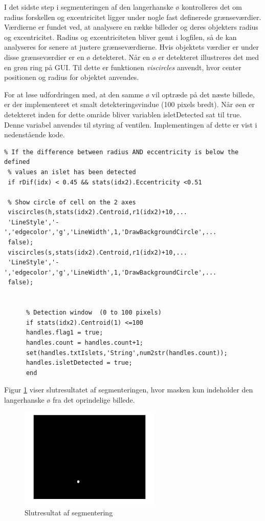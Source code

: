 I det sidste step i segmenteringen af den langerhanske ø kontrolleres det om radius forskellen og excentricitet ligger under nogle fast definerede grænseværdier. Værdierne er fundet ved, at analysere en række billeder og deres objekters radius og excentricitet. Radius og excentriciteten bliver gemt i logfilen, så de kan analyseres for senere at justere grænseværdierne. Hvis objektets værdier er under disse grænseværdier er en ø detekteret. Når en ø er detekteret illustreres det med en grøn ring på GUI. Til dette er funktionen \textit{viscircles} anvendt, hvor center positionen og radius for objektet anvendes. 

For at løse udfordringen med, at den samme ø vil optræde på det næste billede, er der implementeret et smalt detekteringsvindue (100 pixels bredt). Når øen er detekteret inden for dette område bliver variablen isletDetected sat til true. Denne variabel anvendes til styring af ventilen. Implementingen af dette er vist i nedenstående kode.


\begin{lstlisting} 
% If the difference between radius AND eccentricity is below the defined
 % values an islet has been detected
 if rDif(idx) < 0.45 && stats(idx2).Eccentricity <0.51
     
 % Show circle of cell on the 2 axes
 viscircles(h,stats(idx2).Centroid,r1(idx2)+10,...
 'LineStyle','-','edgecolor','g','LineWidth',1,'DrawBackgroundCircle',...
 false);
 viscircles(s,stats(idx2).Centroid,r1(idx2)+10,...
 'LineStyle','-','edgecolor','g','LineWidth',1,'DrawBackgroundCircle',...
 false);

     
      % Detection window  (0 to 100 pixels)
      if stats(idx2).Centroid(1) <=100 
      handles.flag1 = true;
      handles.count = handles.count+1; 
      set(handles.txtIslets,'String',num2str(handles.count));
      handles.isletDetected = true;
      end
\end{lstlisting} 

Figur \ref{fig:segmented} viser slutresultatet af segmenteringen, hvor masken kun indeholder den langerhanske ø fra det oprindelige billede. 


\begin{figure}[H]
	\centering
	\includegraphics[width=0.6\textwidth]{billeder/software/segmented.png}
	\caption{Slutresultat af segmentering}
	\label{fig:segmented}
\end{figure}

